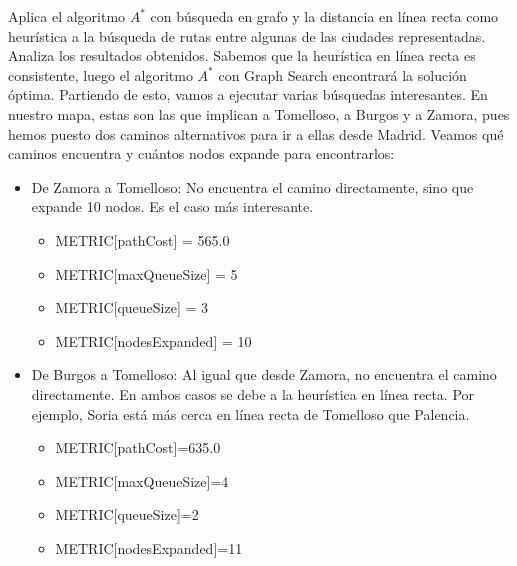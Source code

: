 \documentclass[11pt, a4paper, spanish, openright, twoside]{book}
\begin{document}
		\begin{section}{Aplica el algoritmo $A^*$ con búsqueda en grafo y la distancia en línea recta como heurística a la búsqueda de rutas entre algunas de las ciudades representadas. Analiza los resultados obtenidos.}
			Sabemos que la heurística en línea recta es consistente, luego el algoritmo $A^*$ con Graph Search encontrará la solución óptima. Partiendo de esto, vamos a ejecutar varias búsquedas interesantes. 
			En nuestro mapa, estas son las que implican a Tomelloso, a Burgos y a Zamora, pues hemos puesto dos caminos alternativos para ir a ellas desde Madrid. Veamos qué caminos encuentra y cuántos nodos expande para encontrarlos:
			
				\begin{itemize}
					\item De Zamora a Tomelloso: No encuentra el camino directamente, sino que expande 10 nodos. Es el caso más interesante.
					\begin{itemize}
					
					\item METRIC[pathCost] = 565.0
					\item METRIC[maxQueueSize] = 5
					\item METRIC[queueSize] = 3
					\item METRIC[nodesExpanded] = 10
					
					\end{itemize}
					
				\end{itemize}

				\begin{itemize}

					\item De Burgos a Tomelloso: Al igual que desde Zamora, no encuentra el camino directamente. En ambos casos se debe a la heurística en línea recta. Por ejemplo, Soria está más cerca en línea recta de Tomelloso que Palencia.
					\begin{itemize}
					\item METRIC[pathCost]=635.0
					\item METRIC[maxQueueSize]=4
					\item METRIC[queueSize]=2
					\item METRIC[nodesExpanded]=11
					
					\end{itemize}
					
				\end{itemize}
			

				\begin{itemize}
				

\end{itemize}
\end{section}
\end{document}
